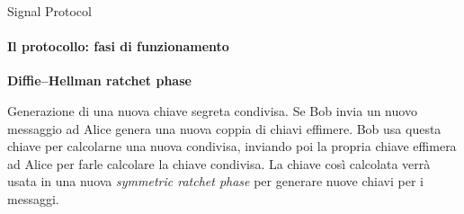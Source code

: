 \begin{frame}{Signal Protocol}
    \framesubtitle{Il protocollo: fasi di funzionamento}
    \textbf{Diffie–Hellman ratchet phase}\newline

    Generazione di una nuova chiave segreta condivisa.\newline\pause
    Se Bob invia un nuovo messaggio ad Alice genera una nuova coppia di chiavi effimere. Bob usa questa chiave per calcolarne una nuova condivisa, inviando poi la propria chiave effimera ad Alice per farle calcolare la chiave condivisa.\newline\pause
    La chiave così calcolata verrà usata in una nuova \textit{symmetric ratchet phase} per generare nuove chiavi per i messaggi.

\end{frame}